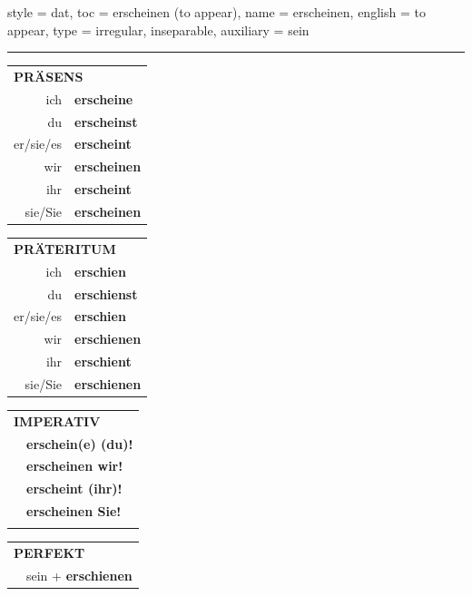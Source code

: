 \begin{verbentry}{
  style = {dat},
  toc = {erscheinen (to appear)},
  name = {erscheinen},
  english = {to appear},
  type = {irregular, inseparable},
  auxiliary = {sein}
}
 
    
     \vspace{5pt}

    \hrule
    
    \vspace{5pt}

  \begin{tabular}{rl}
     \multicolumn{2}{l}{\textbf{PRÄSENS} }\\
    ich & \textbf{erscheine}\\
    du & \textbf{erscheinst}\\
    er/sie/es & \textbf{erscheint}\\
    wir & \textbf{erscheinen}\\
    ihr & \textbf{erscheint}\\
    sie/Sie & \textbf{erscheinen}\\
  \end{tabular}
  \hfill
     \begin{tabular}{rl}
    \multicolumn{2}{l}{\textbf{PRÄTERITUM} }\\
    ich & \textbf{erschien}\\
    du & \textbf{erschienst}\\
    er/sie/es & \textbf{erschien}\\
    wir & \textbf{erschienen}\\
    ihr & \textbf{erschient}\\
    sie/Sie & \textbf{erschienen}\\
  \end{tabular}
  \hfill
  \begin{tabular}{rl}
     \multicolumn{2}{l}{\textbf{IMPERATIV} }\\
   & \textbf{erschein(e) (du)!}\\
   & \textbf{erscheinen wir!}\\
   & \textbf{erscheint (ihr)!}\\
   & \textbf{erscheinen Sie!}\\
   & \vspace{10pt}
  \end{tabular}

    \vspace{10pt}

 \begin{tabular}{rl}
     \multicolumn{2}{l}{\textbf{PERFEKT}}\\
   & sein + \textbf{erschienen}\\
  \end{tabular}
\hfill
   \begin{tabular}{rl}
   

\end{tabular}
\end{verbentry}
